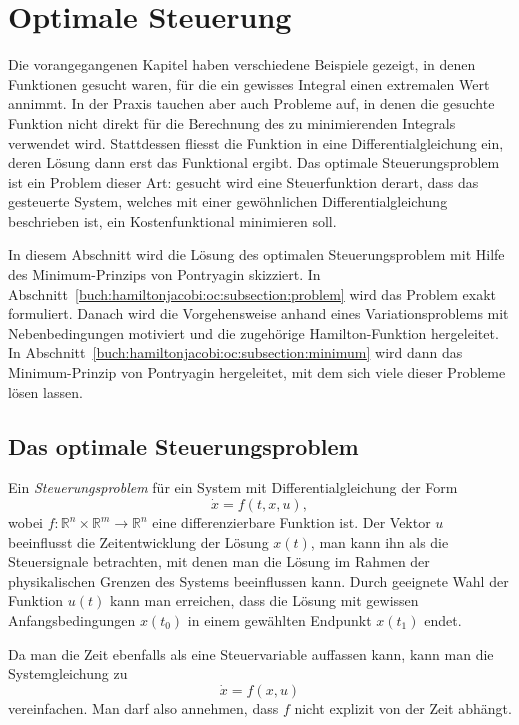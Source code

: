 %
%
%
\section{Optimale Steuerung
\label{buch:hamiltonjacobi:section:oc}}
Die vorangegangenen Kapitel haben verschiedene Beispiele gezeigt,
in denen Funktionen gesucht waren, für die ein gewisses Integral
einen extremalen Wert annimmt.
In der Praxis tauchen aber auch Probleme auf, in denen die
gesuchte Funktion nicht direkt für die Berechnung des zu minimierenden
Integrals verwendet wird.
Stattdessen fliesst die Funktion in eine Differentialgleichung
ein, deren Lösung dann erst das Funktional ergibt.
Das optimale Steuerungsproblem ist ein Problem dieser Art: gesucht
wird eine Steuerfunktion derart, dass das gesteuerte System, welches
mit einer gewöhnlichen Differentialgleichung beschrieben ist, ein
Kostenfunktional minimieren soll.

In diesem Abschnitt wird die Lösung des optimalen Steuerungsproblem
mit Hilfe des Minimum-Prinzips von Pontryagin skizziert.
In Abschnitt~\ref{buch:hamiltonjacobi:oc:subsection:problem}
wird das Problem exakt formuliert.
Danach wird die Vorgehensweise anhand eines Variationsproblems
mit Nebenbedingungen motiviert und die zugehörige Hamilton-Funktion
hergeleitet.
In Abschnitt~\ref{buch:hamiltonjacobi:oc:subsection:minimum}
wird dann das Minimum-Prinzip von Pontryagin hergeleitet, mit dem
sich viele dieser Probleme lösen lassen.

%
%
\subsection{Das optimale Steuerungsproblem
\label{buch:hamiltonjacobi:oc:subsection:problem}}
Ein {\em Steuerungsproblem} für ein System mit Differentialgleichung
%
der Form
\[
\dot{x}
=
f(t, x, u),
\]
wobei $f\colon\mathbb{R}^n\times\mathbb{R}^m\to\mathbb{R}^n$
eine differenzierbare Funktion ist.
Der Vektor $u$ beeinflusst die Zeitentwicklung der Lösung $x(t)$, man
kann ihn als die Steuersignale betrachten, mit denen man die Lösung
im Rahmen der physikalischen Grenzen des Systems beeinflussen kann.
Durch geeignete Wahl der Funktion $u(t)$ kann man erreichen, dass 
die Lösung mit gewissen Anfangsbedingungen $x(t_0)$ in einem
gewählten Endpunkt $x(t_1)$ endet.

Da man die Zeit ebenfalls als eine Steuervariable auffassen kann, 
kann man die Systemgleichung zu
\begin{equation*}
\dot{x}
=
f(x,u)
\end{equation*}
vereinfachen.
Man darf also annehmen, dass $f$ nicht explizit von der Zeit
abhängt.

